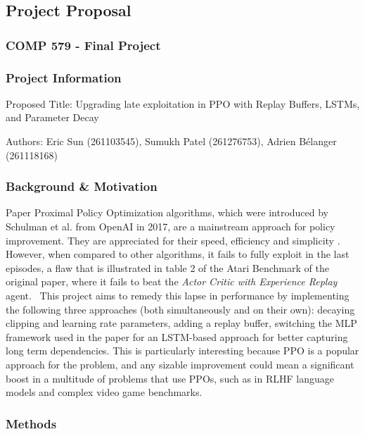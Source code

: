 \documentclass[12pt,letterpaper]{article}
\begin{document}
\begin{center}\section*{Project Proposal}
    \vspace{-1em}
\subsubsection*{COMP 579 - Final Project}


\end{center}

\subsubsection*{Project Information}

Proposed Title: Upgrading late exploitation in PPO with Replay Buffers, LSTMs, and Parameter Decay

Authors: Eric Sun (261103545), Sumukh Patel (261276753), Adrien Bélanger (261118168)

\subsubsection*{Background \& Motivation}
Paper \cite{PPOPaper}
Proximal Policy Optimization algorithms, which were introduced by Schulman et al. from OpenAI in 2017, are a mainstream approach for policy improvement. \cite{PPOPaper}
They are appreciated for their speed, efficiency and simplicity \cite{PPOPaper}. 
However, when compared to other algorithms, it fails to fully exploit in the last episodes, 
a flaw that is illustrated in table 2 of the Atari Benchmark of the original paper, where it fails
to beat the \textit{Actor Critic with Experience Replay} agent. \cite{PPOPaper,ACERPaper} \ This project aims to remedy this lapse in performance by implementing the following three approaches (both simultaneously and on their own): decaying clipping and learning rate parameters, adding a replay buffer, switching the MLP framework used in the paper for an LSTM-based approach for better capturing long term dependencies.
This is particularly interesting because PPO is a popular approach for the problem, and any sizable improvement could mean a significant boost in a multitude of problems that use PPOs, such as in RLHF language models and complex video game benchmarks. \cite{RLHF,dota}
\subsubsection*{Methods}
\end{document}

